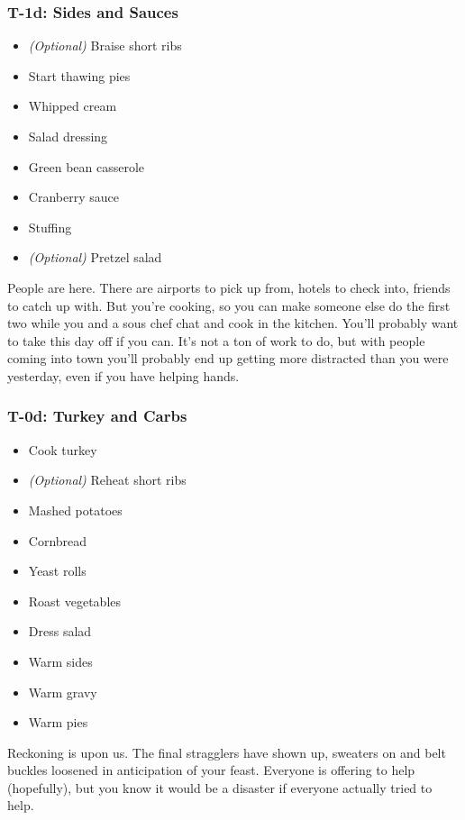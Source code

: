 \documentclass[12pt]{article}
\begin{document}
	\subsubsection{T-1d: Sides and Sauces}
	\begin{itemize}
		\item \textit{(Optional)} Braise short ribs
		\item Start thawing pies
		\item Whipped cream
		\item Salad dressing
		\item Green bean casserole
		\item Cranberry sauce
		\item Stuffing
		\item \textit{(Optional)} Pretzel salad
	\end{itemize}
	
	People are here. There are airports to pick up from, hotels to check into, friends to catch up with. But you're cooking, so you can make someone else do the first two while you and a sous chef chat and cook in the kitchen. You'll probably want to take this day off if you can. It's not a ton of work to do, but with people coming into town you'll probably end up getting more distracted than you were yesterday, even if you have helping hands.
	
	\subsubsection{T-0d: Turkey and Carbs}
	\begin{itemize}
		\item Cook turkey
		\item \textit{(Optional)} Reheat short ribs
		\item Mashed potatoes
		\item Cornbread
		\item Yeast rolls
		\item Roast vegetables
		\item Dress salad
		\item Warm sides
		\item Warm gravy
		\item Warm pies
	\end{itemize}
	
	Reckoning is upon us. The final stragglers have shown up, sweaters on and belt buckles loosened in anticipation of your feast. Everyone is offering to help (hopefully), but you know it would be a disaster if everyone actually tried to help.
	
\end{document}
